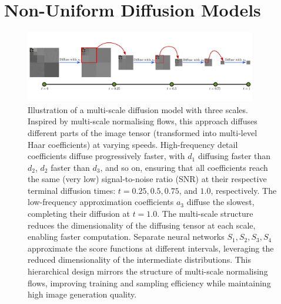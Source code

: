 \section{Non-Uniform Diffusion Models}

\begin{figure}[h]
    \centering
    \includegraphics[width=0.9\textwidth]{Outline/figures/non-uniform-diffusion-models/drawing.png}
    \caption{Illustration of a multi-scale diffusion model with three scales. Inspired by multi-scale normalising flows, this approach diffuses different parts of the image tensor (transformed into multi-level Haar coefficients) at varying speeds. High-frequency detail coefficients diffuse progressively faster, with $d_1$ diffusing faster than $d_2$, $d_2$ faster than $d_3$, and so on, ensuring that all coefficients reach the same (very low) signal-to-noise ratio (SNR) at their respective terminal diffusion times: $t = 0.25, 0.5, 0.75$, and $1.0$, respectively. The low-frequency approximation coefficients $a_3$ diffuse the slowest, completing their diffusion at $t = 1.0$. The multi-scale structure reduces the dimensionality of the diffusing tensor at each scale, enabling faster computation. Separate neural networks $S_1, S_2, S_3, S_4$ approximate the score functions at different intervals, leveraging the reduced dimensionality of the intermediate distributions. This hierarchical design mirrors the structure of multi-scale normalising flows, improving training and sampling efficiency while maintaining high image generation quality.}
    \label{fig:Multiscale model}
\end{figure}

